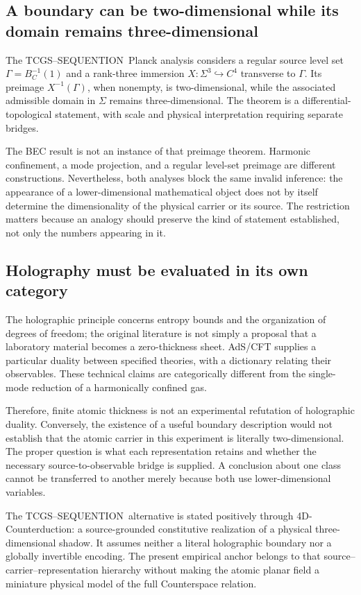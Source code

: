 \documentclass[11pt,a4paper]{article}
\theoremstyle{definition}
\theoremstyle{remark}
\newcommand{\TCGS}{TCGS--SEQUENTION}
\begin{document}
\subsection{A boundary can be two-dimensional while its domain remains three-dimensional}
The \TCGS\ Planck analysis considers a regular source level set $\Gamma=B_C^{-1}(1)$ and a rank-three immersion $X:\Sigma^3\hookrightarrow C^4$ transverse to $\Gamma$. Its preimage $X^{-1}(\Gamma)$, when nonempty, is two-dimensional, while the associated admissible domain in $\Sigma$ remains three-dimensional. The theorem is a differential-topological statement, with scale and physical interpretation requiring separate bridges.\cite{planck}

The BEC result is not an instance of that preimage theorem. Harmonic confinement, a mode projection, and a regular level-set preimage are different constructions. Nevertheless, both analyses block the same invalid inference: the appearance of a lower-dimensional mathematical object does not by itself determine the dimensionality of the physical carrier or its source. The restriction matters because an analogy should preserve the kind of statement established, not only the numbers appearing in it.\cite{planck}

\subsection{Holography must be evaluated in its own category}
The holographic principle concerns entropy bounds and the organization of degrees of freedom; the original literature is not simply a proposal that a laboratory material becomes a zero-thickness sheet. AdS/CFT supplies a particular duality between specified theories, with a dictionary relating their observables. These technical claims are categorically different from the single-mode reduction of a harmonically confined gas.\cite{susskind,maldacena,bousso}

Therefore, finite atomic thickness is not an experimental refutation of holographic duality. Conversely, the existence of a useful boundary description would not establish that the atomic carrier in this experiment is literally two-dimensional. The proper question is what each representation retains and whether the necessary source-to-observable bridge is supplied. A conclusion about one class cannot be transferred to another merely because both use lower-dimensional variables.

The \TCGS\ alternative is stated positively through 4D-Counterduction: a source-grounded constitutive realization of a physical three-dimensional shadow. It assumes neither a literal holographic boundary nor a globally invertible encoding. The present empirical anchor belongs to that source--carrier--representation hierarchy without making the atomic planar field a miniature physical model of the full Counterspace relation.\cite{foundation}
\end{document}
